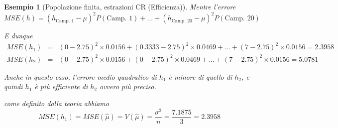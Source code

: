 \documentclass[
  11pt,
]{book}
\theoremstyle{mytheoremstyle}
\theoremstyle{mydefstyle}
\newtheorem{example}{{Esempio}}[section]
\newenvironment{nota}
  {
\begin{tcolorbox}[enhanced,breakable,arc=0.1mm,boxrule=1pt,colback=white,colframe=iblue,title=\bf \fontfamily{lmss}\selectfont \faInfoCircle \hspace{.5 cm} Nota,drop fuzzy shadow]
}{
\end{tcolorbox}
  }
\begin{document}
\begin{example}[Popolazione finita, estrazioni CR (Efficienza)]

Mentre l'errore
\[MSE(h)=(h_\text{Camp. 1}-\mu)^2P(\text{Camp. 1})+...+(h_\text{Camp. 20}-\mu)^2P(\text{Camp. 20})\]

E dunque
\begin{eqnarray*}
  MSE(h_1) &=& (0-2.75)^2\times0.0156+(0.3333-2.75)^2\times0.0469+...+
    (7-2.75)^2\times0.0156=2.3958\\
  MSE(h_2) &=& (0-2.75)^2\times0.0156+(0-2.75)^2\times0.0469+...+
    (7-2.75)^2\times0.0156=5.0781
\end{eqnarray*}

Anche in questo caso, l'errore medio quadratico di \(h_1\) è minore di quello di \(h_2\), e quindi \(h_1\) è più efficiente di \(h_2\) ovvero più \emph{preciso}.

\begin{nota}
come definito dalla teoria abbiamo
\[MSE(h_1)=MSE(\hat \mu)=V(\hat \mu)=\frac{\sigma^2}n=\frac{7.1875}{3}=2.3958\]

\end{nota}

\end{example}
\end{document}
